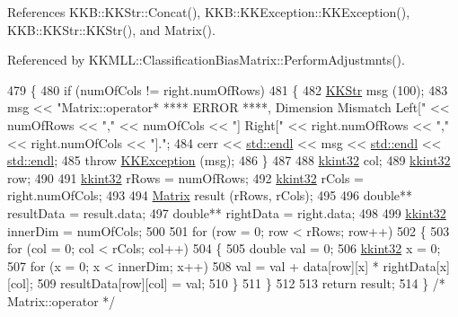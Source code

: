 References K\+K\+B\+::\+K\+K\+Str\+::\+Concat(), K\+K\+B\+::\+K\+K\+Exception\+::\+K\+K\+Exception(), K\+K\+B\+::\+K\+K\+Str\+::\+K\+K\+Str(), and Matrix().



Referenced by K\+K\+M\+L\+L\+::\+Classification\+Bias\+Matrix\+::\+Perform\+Adjustmnts().


\begin{DoxyCode}
479 \{
480   \textcolor{keywordflow}{if}  (numOfCols != right.numOfRows)
481   \{
482     \hyperlink{class_k_k_b_1_1_k_k_str}{KKStr}  msg (100);
483     msg << \textcolor{stringliteral}{"Matrix::operator*   **** ERROR ****,  Dimension Mismatch  Left["}  << numOfRows << \textcolor{stringliteral}{","} << 
      numOfCols << \textcolor{stringliteral}{"]  Right["} << right.numOfRows << \textcolor{stringliteral}{","} << right.numOfCols << \textcolor{stringliteral}{"]."};
484     cerr << \hyperlink{namespace_k_k_b_ad1f50f65af6adc8fa9e6f62d007818a8}{std::endl} << msg << \hyperlink{namespace_k_k_b_ad1f50f65af6adc8fa9e6f62d007818a8}{std::endl} << \hyperlink{namespace_k_k_b_ad1f50f65af6adc8fa9e6f62d007818a8}{std::endl};
485     \textcolor{keywordflow}{throw}  \hyperlink{class_k_k_b_1_1_k_k_exception}{KKException} (msg);
486   \}
487 
488   \hyperlink{namespace_k_k_b_a8fa4952cc84fda1de4bec1fbdd8d5b1b}{kkint32}  col;
489   \hyperlink{namespace_k_k_b_a8fa4952cc84fda1de4bec1fbdd8d5b1b}{kkint32}  row;
490 
491   \hyperlink{namespace_k_k_b_a8fa4952cc84fda1de4bec1fbdd8d5b1b}{kkint32}  rRows = numOfRows;
492   \hyperlink{namespace_k_k_b_a8fa4952cc84fda1de4bec1fbdd8d5b1b}{kkint32}  rCols = right.numOfCols;
493 
494   \hyperlink{class_k_k_b_1_1_matrix}{Matrix}  result (rRows, rCols);
495 
496   \textcolor{keywordtype}{double}**  resultData = result.data;
497   \textcolor{keywordtype}{double}**  rightData  = right.data;
498 
499   \hyperlink{namespace_k_k_b_a8fa4952cc84fda1de4bec1fbdd8d5b1b}{kkint32}  innerDim = numOfCols;
500 
501   \textcolor{keywordflow}{for}  (row = 0;   row < rRows;  row++)
502   \{
503     \textcolor{keywordflow}{for}  (col = 0;  col < rCols;  col++)
504     \{
505        \textcolor{keywordtype}{double}  val = 0;
506        \hyperlink{namespace_k_k_b_a8fa4952cc84fda1de4bec1fbdd8d5b1b}{kkint32} x   = 0;
507        \textcolor{keywordflow}{for}  (x = 0; x < innerDim; x++)
508          val = val + data[row][x] * rightData[x][col];
509        resultData[row][col] = val;
510     \}
511   \}
512 
513   \textcolor{keywordflow}{return}  result;
514 \}  \textcolor{comment}{/* Matrix::operator */}
\end{DoxyCode}
